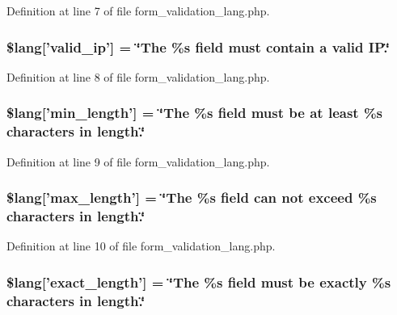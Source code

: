 Definition at line 7 of file form\-\_\-validation\-\_\-lang.\-php.

\hypertarget{form__validation__lang_8php_ad153ba0f29eaf9bbdb529c2f03f29751}{
\subsubsection[{\$lang}]{\setlength{\rightskip}{0pt plus 5cm}\$lang\mbox{[}'valid\-\_\-ip'\mbox{]} = \char`\"{}The \%s field must contain {\bf a} valid I\-P.\char`\"{}}}\label{form__validation__lang_8php_ad153ba0f29eaf9bbdb529c2f03f29751}


Definition at line 8 of file form\-\_\-validation\-\_\-lang.\-php.

\hypertarget{form__validation__lang_8php_a64646d89fb51eebd0b5bea81fd17eb1f}{
\subsubsection[{\$lang}]{\setlength{\rightskip}{0pt plus 5cm}\$lang\mbox{[}'min\-\_\-length'\mbox{]} = \char`\"{}The \%s field must be at least \%s characters in length.\char`\"{}}}\label{form__validation__lang_8php_a64646d89fb51eebd0b5bea81fd17eb1f}


Definition at line 9 of file form\-\_\-validation\-\_\-lang.\-php.

\hypertarget{form__validation__lang_8php_a813327453a2d63855f7d6f84c9b58d49}{
\subsubsection[{\$lang}]{\setlength{\rightskip}{0pt plus 5cm}\$lang\mbox{[}'max\-\_\-length'\mbox{]} = \char`\"{}The \%s field can {\bf not} exceed \%s characters in length.\char`\"{}}}\label{form__validation__lang_8php_a813327453a2d63855f7d6f84c9b58d49}


Definition at line 10 of file form\-\_\-validation\-\_\-lang.\-php.

\hypertarget{form__validation__lang_8php_af951a7ce2f4a4afd7da33e7fac480175}{
\subsubsection[{\$lang}]{\setlength{\rightskip}{0pt plus 5cm}\$lang\mbox{[}'exact\-\_\-length'\mbox{]} = \char`\"{}The \%s field must be exactly \%s characters in length.\char`\"{}}}\label{form__validation__lang_8php_af951a7ce2f4a4afd7da33e7fac480175}


